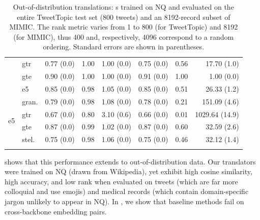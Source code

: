 \begin{table}[t]
\begin{tabular}{llrrr|rrr}
        & gtr & 0.77 {\tiny (0.0)} & 1.00 & 1.00 {\tiny (0.0)} & 0.75 {\tiny (0.0)} & 0.56 & 17.70 {\tiny (1.0)} \\
        & gte & 0.90 {\tiny (0.0)} & 1.00 & 1.00 {\tiny (0.0)} & 0.91 {\tiny (0.0)} & 1.00 & 1.00 {\tiny (0.0)} \\
        & e5 & 0.85 {\tiny (0.0)} & 0.98 & 1.05 {\tiny (0.0)} & 0.85 {\tiny (0.0)} & 0.51 & 26.33 {\tiny (1.2)} \\
        \midrule
        \multirow{4}{*}{e5} & gran. & 0.79 {\tiny (0.0)} & 0.98 & 1.08 {\tiny (0.0)} & 0.78 {\tiny (0.0)} & 0.21 & 151.09 {\tiny (4.6)} \\
        & gtr & 0.67 {\tiny (0.0)} & 0.80 & 3.10 {\tiny (0.6)} & 0.66 {\tiny (0.0)} & 0.01 & 1029.64 {\tiny (14.9)} \\
        & gte & 0.87 {\tiny (0.0)} & 0.99 & 1.02 {\tiny (0.0)} & 0.87 {\tiny (0.0)} & 0.60 & 32.59 {\tiny (2.6)} \\
        & stel. & 0.75 {\tiny (0.0)} & 0.98 & 1.06 {\tiny (0.0)} & 0.75 {\tiny (0.0)} & 0.46 & 32.12 {\tiny (1.4)} \\
        \bottomrule\\[-1.6ex]
    \end{tabular}
    \caption{Out-of-distribution translations: \atk{}s trained on NQ and evaluated on the entire TweetTopic test set (800 tweets) and an 8192-record subset of MIMIC. The rank metric varies from 1 to 800 (for TweetTopic) and 8192 (for MIMIC), thus 400 and, respectively, 4096 correspond to a random ordering. Standard errors are shown in parentheses.}
    \label{tab:embeddings_ood}
\end{table}

 shows that this performance extends to out-of-distribution data.  Our \atk{} translators were trained on NQ (drawn from Wikipedia), yet exhibit high cosine similarity, high accuracy, and low rank when evaluated on tweets (which are far more colloquial and use emojis) and medical records (which contain domain-specific jargon unlikely to appear in NQ). In , we show that baseline methods fail on cross-backbone embedding pairs.


